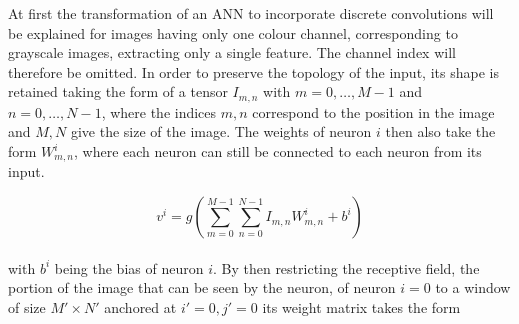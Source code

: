 At first the transformation of an ANN to incorporate discrete convolutions will be explained for images having only one colour channel, corresponding to grayscale images, extracting only a single feature. The channel index will therefore be omitted. In order to preserve the topology of the input, its shape is retained taking the form of a tensor $I_{m,n}$ with $m=0,\dots ,M-1$ and $n=0,\dots ,N-1$, where the indices $m,n$ correspond to the position in the image and $M,N$ give the size of the image. The weights of neuron $i$ then also take the form $W^i_{m,n}$, where each neuron can still be connected to each neuron from its input.

\begin{equation}
v^i = g\left( \sum_{m=0}^{M-1} \sum_{n=0}^{N-1} I_{m,n} W_{m,n}^i + b^i \right)
\end{equation} \\
with $b^i$ being the bias of neuron $i$. By then restricting the receptive field, the portion of the image that can be seen by the neuron, of neuron $i=0$ to a window of size $M'\times N'$ anchored at $i'=0,j'=0$ its weight matrix takes the form

